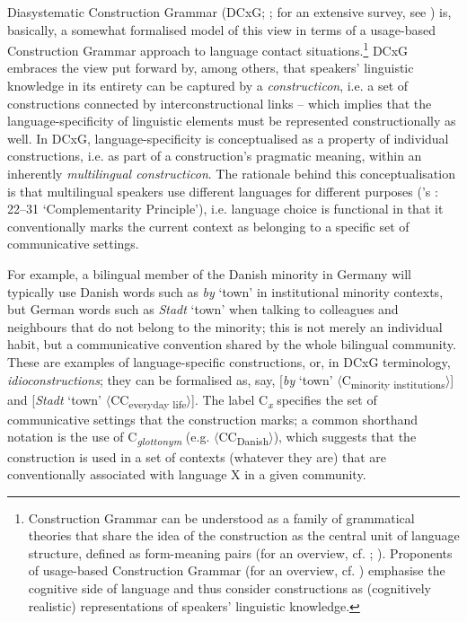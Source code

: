 \documentclass[output=paper]{langsci/langscibook}
\begin{document}
Diasystematic Construction Grammar (DCxG; \citealt{Hoder.2012, Hoder.2014, Hoder.2018, Hoder.2019b}; for an extensive survey, see \citealt{Hoder.2018}) is, basically, a somewhat formalised model of this view in terms of a usage-based Construction Grammar approach to language contact situations.\footnote{Construction Grammar can be understood as a family of grammatical theories that share the idea of the construction as the central unit of language structure, defined as form-meaning pairs (for an overview, cf. \citealt{Hoffmann.2013}; \citealt{Hilpert.2019}). Proponents of usage-based Construction Grammar (for an overview, cf. \citealt{Diessel.2019}) emphasise the cognitive side of language and thus consider constructions as (cognitively realistic) representations of speakers’ linguistic knowledge.} DCxG embraces the view put forward by, among others, \citet[18]{Goldberg.2006} that speakers’ linguistic knowledge in its entirety can be captured by a \textit{constructicon}, i.e. a set of constructions connected by interconstructional links – which implies that the language-specificity of linguistic elements must be represented constructionally as well. In DCxG, language-specificity is conceptualised as a property of individual constructions, i.e. as part of a construction’s pragmatic meaning, within an inherently \textit{multilingual constructicon}. The rationale behind this conceptualisation is that multilingual speakers use different languages for different purposes (\citeauthor{Grosjean.2008}'s \citeyear{Grosjean.2008}: 22--31 ‘Complementarity Principle’), i.e. language choice is functional in that it conventionally marks the current context as belonging to a specific set of communicative settings.

For example, a bilingual member of the Danish minority in Germany will typically use Danish words such as \textit{by} ‘town’ in institutional minority contexts, but German words such as \textit{Stadt} ‘town’ when talking to colleagues and neighbours that do not belong to the minority; this is not merely an individual habit, but a communicative convention shared by the whole bilingual community. These are examples of language-specific constructions, or, in DCxG terminology, \textit{idioconstructions}; they can be formalised as, say, {[}\textit{by} ‘town’ $\langle$C\textsubscript{minority institutions}$\rangle${]} and {[}\textit{Stadt} ‘town’ $\langle$CC\textsubscript{everyday life}$\rangle${]}. The label C\textit{\textsubscript{x}} specifies the set of communicative settings that the construction marks; a common shorthand notation is the use of C\textit{\textsubscript{glottonym}} (e.g. $\langle$CC\textsubscript{Danish}$\rangle$), which suggests that the construction is used in a set of contexts (whatever they are) that are conventionally associated with language X in a given community.
\end{document}
